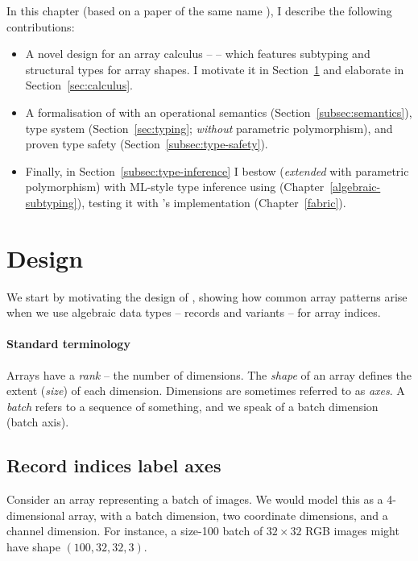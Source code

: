 In this chapter (based on a paper of the same name \cite{star}), I describe the following contributions: \begin{itemize}
    \item A novel design for an array calculus – \starr{} – which features subtyping and structural types for array shapes. I motivate it in Section~\ref{sec:design} and elaborate in Section~\ref{sec:calculus}.
    \item A formalisation of with an operational semantics (Section~\ref{subsec:semantics}), type system (Section~\ref{sec:typing};  \emph{without} parametric polymorphism), and proven type safety (Section~\ref{subsec:type-safety}).
    \item Finally, in Section~\ref{subsec:type-inference} I bestow \starr{} (\emph{extended} with parametric polymorphism) with ML-style type inference using \inference{} (Chapter~\ref{algebraic-subtyping}), testing it with \compiler{}'s implementation (Chapter~\ref{fabric}).
\end{itemize}

\newpage
\section{Design}
\label{sec:design}

We start by motivating the design of \starr{}, showing how common array patterns arise when we use algebraic data types -- records and variants -- for array indices.

\paragraph{Standard terminology} 
Arrays have a \emph{rank} -- the number of dimensions. The \emph{shape} of an array defines the extent (\emph{size}) of
each dimension. Dimensions are sometimes referred to as \emph{axes}.
A \emph{batch} refers to a sequence of something, and we speak of a batch dimension (batch axis).

\subsection{Record indices label axes}

Consider an array representing a batch of images. We would model this as a 4-dimensional array, with a batch dimension, two coordinate dimensions, and a channel dimension. For instance, a size-100 batch of $32 \times 32$ RGB images might have shape $(100, 32, 32, 3)$.

